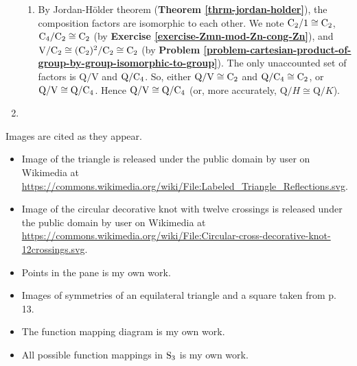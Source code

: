 \begin{enumerate}
\begin{enumerate}[label=(\roman*)]
        \item By Jordan-H\"older theorem (\textbf{Theorem \ref{thrm-jordan-holder}}), the composition factors are isomorphic to each other. We note $\mathrm{C}_{2} / 1 \cong \mathrm{C}_{2}$, $\mathrm{C}_{4} / \mathrm{C}_{2} \cong \mathrm{C}_{2}$ (by \textbf{Exercise \ref{exercise-Zmn-mod-Zn-cong-Zn}}), and $\mathrm{V} / \mathrm{C}_{2} \cong (\mathrm{C}_{2})^2 / \mathrm{C}_{2} \cong \mathrm{C}_{2}$ (by \textbf{Problem \ref{problem-cartesian-product-of-group-by-group-isomorphic-to-group}}). The only unaccounted set of factors is $\mathrm{Q}/\mathrm{V}$ and $\mathrm{Q}/\mathrm{C}_{4}$. So, either $\mathrm{Q}/\mathrm{V} \cong \mathrm{C}_{2}$ and $\mathrm{Q}/\mathrm{C}_{4} \cong \mathrm{C}_{2}$, or $\mathrm{Q}/\mathrm{V} \cong \mathrm{Q}/\mathrm{C}_{4}$. Hence $\mathrm{Q}/\mathrm{V} \cong \mathrm{Q}/\mathrm{C}_{4}$ (or, more accurately, $\mathrm{Q}/H \cong \mathrm{Q}/K$).
    \end{enumerate}
    
    \item %
\end{enumerate}

Images are cited as they appear.

\begin{itemize}
    \item Image of the triangle is released under the public domain by user  on Wikimedia at \url{https://commons.wikimedia.org/wiki/File:Labeled_Triangle_Reflections.svg}.
    \item Image of the circular decorative knot with twelve crossings is released under the public domain by user  on Wikimedia at \url{https://commons.wikimedia.org/wiki/File:Circular-cross-decorative-knot-12crossings.svg}.
    \item Points in the pane is my own work.
\end{itemize}

\begin{itemize}
    \item Images of symmetries of an equilateral triangle and a square taken from \cite{milne_2021} p. 13.
\end{itemize}

\begin{itemize}
    \item The function mapping diagram is my own work.
\end{itemize}

\begin{itemize}
    \item All possible function mappings in $\mathrm{S}_{3}$ is my own work.
\end{itemize}

